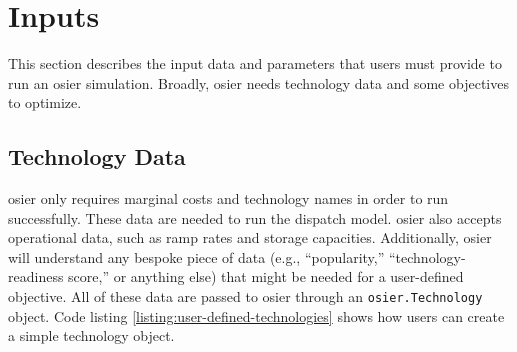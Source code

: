 \section{Inputs}




This section describes the input data and parameters that users must provide to run an \ac{osier} simulation. Broadly, \ac{osier} needs
technology data and some objectives to optimize. 

\subsection{Technology Data}
\ac{osier} only requires marginal costs and technology names in order to run successfully.
These data are needed to run the dispatch model. \ac{osier} also accepts operational data, such
as ramp rates and storage capacities. Additionally, \ac{osier} will understand any bespoke 
piece of data (e.g., ``popularity,'' ``technology-readiness score,'' or anything else) that
might be needed for a user-defined objective. All of these data are passed to \ac{osier}
through an \texttt{osier.Technology} object. Code listing \ref{listing:user-defined-technologies}
shows how users can create a simple technology object.


